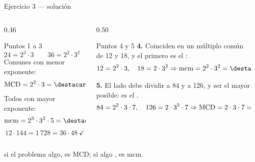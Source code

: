 \documentclass[aspectratio=169,10pt]{beamer}
\begin{document}
\begin{frame}{Ejercicio 3 — solución}
  \scriptsize
  \begin{columns}[T,onlytextwidth]
    \begin{column}{0.46\textwidth}
      \begin{block}{Puntos 1 a 3}
        \tiny
        \[ 24 = 2^3\cdot 3 \qquad 36 = 2^2\cdot 3^2 \qquad
           60 = 2^2\cdot 3\cdot 5 \]
        Comunes con menor exponente:
        \[ \mathrm{MCD} = 2^2\cdot 3 = \destacar{12} \]
        Todos con mayor exponente:
        \[ \mathrm{mcm} = 2^3\cdot 3^2\cdot 5 = \destacar{360} \]
        \[ 12\cdot 144 = 1\,728 = 36\cdot 48 \ \checkmark \]
      \end{block}
    \end{column}
    \begin{column}{0.50\textwidth}
      \begin{exampleblock}{Puntos 4 y 5}
        \tiny
        \textbf{4.} Coinciden en un múltiplo común de 12 y 18, y el primero es
        el :
        \[ 12 = 2^2\cdot 3,\quad 18 = 2\cdot 3^2 \Rightarrow
           \mathrm{mcm} = 2^2\cdot 3^2 = \destacar{36 \text{ min}} \]

        \textbf{5.} El lado debe dividir a 84 y a 126, y ser el mayor posible:
        es el .
        \[ 84 = 2^2\cdot 3\cdot 7,\quad 126 = 2\cdot 3^2\cdot 7 \Rightarrow
           \mathrm{MCD} = 2\cdot 3\cdot 7 = \destacar{42 \text{ cm}} \]
      \end{exampleblock}
    \end{column}
  \end{columns}

  \vspace{0.05cm}
  {\tiny\color{uniGris}  si el problema
   algo, es MCD; si algo , es mcm.}
\end{frame}
\end{document}
